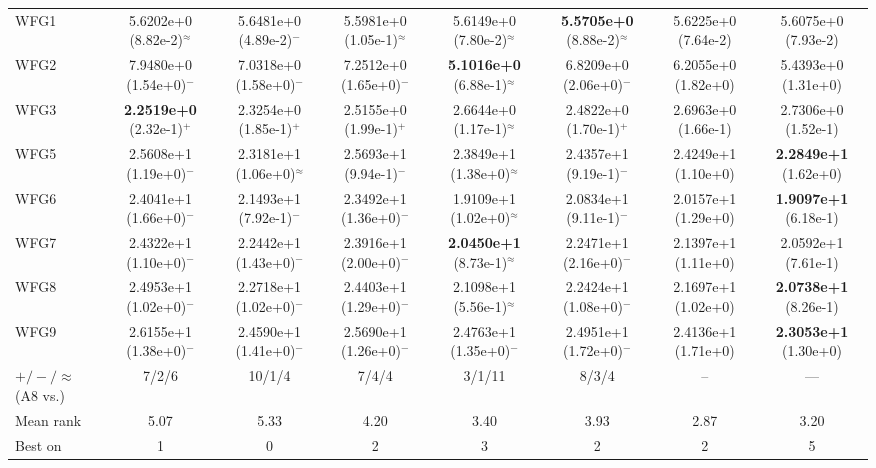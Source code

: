 \begin{table}[!t]
\begin{tabular}{lccccccc}
WFG1 & 5.6202e+0 (8.82e-2)$^{\approx}$ & 5.6481e+0 (4.89e-2)$^{-}$ & 5.5981e+0 (1.05e-1)$^{\approx}$ & 5.6149e+0 (7.80e-2)$^{\approx}$ & \textbf{5.5705e+0} (8.88e-2)$^{\approx}$ & 5.6225e+0 (7.64e-2) & 5.6075e+0 (7.93e-2) \\
WFG2 & 7.9480e+0 (1.54e+0)$^{-}$ & 7.0318e+0 (1.58e+0)$^{-}$ & 7.2512e+0 (1.65e+0)$^{-}$ & \textbf{5.1016e+0} (6.88e-1)$^{\approx}$ & 6.8209e+0 (2.06e+0)$^{-}$ & 6.2055e+0 (1.82e+0) & 5.4393e+0 (1.31e+0) \\
WFG3 & \textbf{2.2519e+0} (2.32e-1)$^{+}$ & 2.3254e+0 (1.85e-1)$^{+}$ & 2.5155e+0 (1.99e-1)$^{+}$ & 2.6644e+0 (1.17e-1)$^{\approx}$ & 2.4822e+0 (1.70e-1)$^{+}$ & 2.6963e+0 (1.66e-1) & 2.7306e+0 (1.52e-1) \\
WFG5 & 2.5608e+1 (1.19e+0)$^{-}$ & 2.3181e+1 (1.06e+0)$^{\approx}$ & 2.5693e+1 (9.94e-1)$^{-}$ & 2.3849e+1 (1.38e+0)$^{\approx}$ & 2.4357e+1 (9.19e-1)$^{-}$ & 2.4249e+1 (1.10e+0) & \textbf{2.2849e+1} (1.62e+0) \\
WFG6 & 2.4041e+1 (1.66e+0)$^{-}$ & 2.1493e+1 (7.92e-1)$^{-}$ & 2.3492e+1 (1.36e+0)$^{-}$ & 1.9109e+1 (1.02e+0)$^{\approx}$ & 2.0834e+1 (9.11e-1)$^{-}$ & 2.0157e+1 (1.29e+0) & \textbf{1.9097e+1} (6.18e-1) \\
WFG7 & 2.4322e+1 (1.10e+0)$^{-}$ & 2.2442e+1 (1.43e+0)$^{-}$ & 2.3916e+1 (2.00e+0)$^{-}$ & \textbf{2.0450e+1} (8.73e-1)$^{\approx}$ & 2.2471e+1 (2.16e+0)$^{-}$ & 2.1397e+1 (1.11e+0) & 2.0592e+1 (7.61e-1) \\
WFG8 & 2.4953e+1 (1.02e+0)$^{-}$ & 2.2718e+1 (1.02e+0)$^{-}$ & 2.4403e+1 (1.29e+0)$^{-}$ & 2.1098e+1 (5.56e-1)$^{\approx}$ & 2.2424e+1 (1.08e+0)$^{-}$ & 2.1697e+1 (1.02e+0) & \textbf{2.0738e+1} (8.26e-1) \\
WFG9 & 2.6155e+1 (1.38e+0)$^{-}$ & 2.4590e+1 (1.41e+0)$^{-}$ & 2.5690e+1 (1.26e+0)$^{-}$ & 2.4763e+1 (1.35e+0)$^{-}$ & 2.4951e+1 (1.72e+0)$^{-}$ & 2.4136e+1 (1.71e+0) & \textbf{2.3053e+1} (1.30e+0) \\
\midrule
$+/-/\approx$ (A8 vs.) & 7/2/6 & 10/1/4 & 7/4/4 & 3/1/11 & 8/3/4 & -- & --- \\
Mean rank & 5.07 & 5.33 & 4.20 & 3.40 & 3.93 & 2.87 & 3.20 \\
Best on & 1 & 0 & 2 & 3 & 2 & 2 & 5 \\
\bottomrule
\end{tabular}
\end{table}

